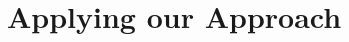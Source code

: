 \documentclass[12pt,oneside]{book}
\begin{document}


\newpage\ 


\newpage \ \newpage \ 
\part{Applying our Approach}
\label{part3}
\newpage\ 







\newpage\ 


\end{document}
